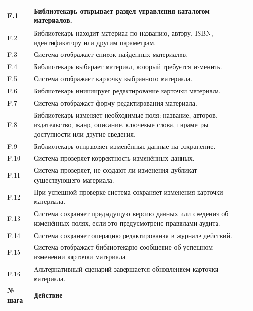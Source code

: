\documentclass[12pt,a4paper]{article}
\begin{document}
\begin{xltabular}{\textwidth}{
				|>{\raggedright\arraybackslash}p{2.7cm}
				|>{\raggedright\arraybackslash}X|
			}
			F.1 & Библиотекарь открывает раздел управления каталогом материалов. \\
			\hline
			F.2 & Библиотекарь находит материал по названию, автору, ISBN, идентификатору
			или другим параметрам. \\
			\hline
			F.3 & Система отображает список найденных материалов. \\
			\hline
			F.4 & Библиотекарь выбирает материал, который требуется изменить. \\
			\hline
			F.5 & Система отображает карточку выбранного материала. \\
			\hline
			F.6 & Библиотекарь инициирует редактирование карточки материала. \\
			\hline
			F.7 & Система отображает форму редактирования материала. \\
			\hline
			F.8 & Библиотекарь изменяет необходимые поля: название, авторов,
			издательство, жанр, описание, ключевые слова, параметры доступности
			или другие сведения. \\
			\hline
			F.9 & Библиотекарь отправляет изменённые данные на сохранение. \\
			\hline
			F.10 & Система проверяет корректность изменённых данных. \\
			\hline
			F.11 & Система проверяет, не создают ли изменения дубликат существующего
			материала. \\
			\hline
			F.12 & При успешной проверке система сохраняет изменения карточки
			материала. \\
			\hline
			F.13 & Система сохраняет предыдущую версию данных или сведения об изменённых
			полях, если это предусмотрено правилами аудита. \\
			\hline
			F.14 & Система сохраняет операцию редактирования в журнале действий. \\
			\hline
			F.15 & Система отображает библиотекарю сообщение об успешном изменении
			карточки материала. \\
			\hline
			F.16 & Альтернативный сценарий завершается обновлением карточки материала. \\
			\hline
			
			
			\textbf{№ шага} & \textbf{Действие} \\
			\hline
			

\end{xltabular}
\end{document}
